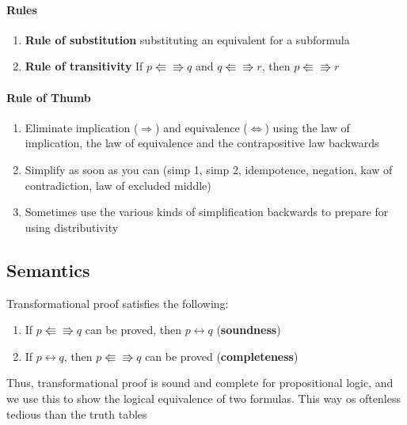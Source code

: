     \paragraph{Rules}
      \begin{enumerate}
        \item \textbf{Rule of substitution} substituting an equivalent for a
          subformula
        \item \textbf{Rule of transitivity} If $p\Lleftarrow\Rrightarrow q$ and
          $q\Lleftarrow\Rrightarrow r$, then $p\Lleftarrow\Rrightarrow r$
      \end{enumerate}

      \paragraph{Rule of Thumb}
      \begin{enumerate}
        \item Eliminate implication ($\Rightarrow$) and
          equivalence ($\Leftrightarrow$) using the law of implication, the law
          of equivalence and the contrapositive law backwards
        \item Simplify as soon as you can (simp 1, simp 2, idempotence,
          negation, kaw of contradiction, law of excluded middle)
        \item Sometimes use the various kinds of simplification backwards to
          prepare for using distributivity
      \end{enumerate}

    \subsection{Semantics}
      Transformational proof satisfies the following:
      \begin{enumerate}
        \item If $p\Lleftarrow\Rrightarrow q$ can be proved, then $p
          \leftrightarrow q$ (\textbf{soundness})
        \item If $p \leftrightarrow q$, then $p\Lleftarrow\Rrightarrow q$ can
          be proved (\textbf{completeness})
      \end{enumerate}
      Thus, transformational proof is sound and complete for propositional
      logic, and we use this to show the logical equivalence of two formulas.
      This way os oftenless tedious than the truth tables
